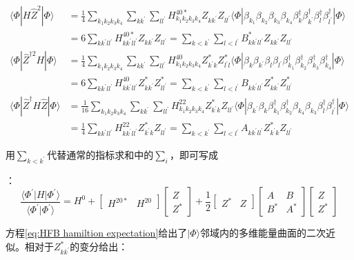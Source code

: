 \begin{booknote*}
\begin{align*}
\langle\Phi|H\hat{Z}^{2}|\Phi\rangle & =\frac{1}{4}\sum_{k_{1}k_{2}k_{3}k_{4}}\sum_{kk^{\prime}}\sum_{ll^{\prime}}H^{40*}_{k_{1}k_{2}k_{3}k_{4}}Z_{kk^{\prime}}Z_{ll^{\prime}}\langle\Phi|\beta_{k_{1}}\beta_{k_{2}}\beta_{k_{3}}\beta_{k_{4}}\beta^{\dagger}_{k}\beta^{\dagger}_{k^{\prime}}\beta^{\dagger}_{l}\beta^{\dagger}_{l^{\prime}}|\Phi\rangle\\
 & =6\sum_{kk^{\prime}ll^{\prime}}H^{40*}_{kk^{\prime}ll^{\prime}}Z_{kk^{\prime}}Z_{ll^{\prime}}=\sum_{k<k^{\prime}}\sum_{l<l^{\prime}}B^{*}_{kk^{\prime}ll^{\prime}}Z_{kk^{\prime}}Z_{ll^{\prime}}\\
\langle\Phi|\hat{Z}^{\dagger2}H|\Phi\rangle & =\frac{1}{4}\sum_{k_{1}k_{2}k_{3}k_{4}}\sum_{kk^{\prime}}\sum_{ll^{\prime}}H^{40}_{k_{1}k_{2}k_{3}k_{4}}Z^{*}_{k^{\prime}k}Z^{*}_{l^{\prime}l}\langle\Phi|\beta_{k}\beta_{k^{\prime}}\beta_{l}\beta_{l^{\prime}}\beta^{\dagger}_{k_{1}}\beta^{\dagger}_{k_{2}}\beta^{\dagger}_{k_{3}}\beta^{\dagger}_{k_{4}}|\Phi\rangle\\
 & =6\sum_{kk^{\prime}ll^{\prime}}H^{40}_{kk^{\prime}ll^{\prime}}Z^{*}_{kk^{\prime}}Z^{*}_{ll^{\prime}}=\sum_{k<k^{\prime}}\sum_{l<l^{\prime}}B_{kk^{\prime}ll^{\prime}}Z^{*}_{kk^{\prime}}Z^{*}_{ll^{\prime}}\\
\langle\Phi|\hat{Z}^{\dagger}H\hat{Z}|\Phi\rangle & =\frac{1}{16}\sum_{k_{1}k_{2}k_{3}k_{4}}\sum_{kk^{\prime}}\sum_{ll^{\prime}}H^{22}_{k_{1}k_{2}k_{3}k_{4}}Z^{*}_{k^{\prime}k}Z_{ll^{\prime}}\langle\Phi|\beta_{k^{\prime}}\beta_{k}\beta^{\dagger}_{k_{1}}\beta^{\dagger}_{k_{2}}\beta_{k_{4}}\beta_{k_{3}}\beta^{\dagger}_{l}\beta^{\dagger}_{l^{\prime}}|\Phi\rangle\\
 & =\frac{1}{4}\sum_{kk^{\prime}ll^{\prime}}H^{22}_{kk^{\prime}ll^{\prime}}Z^{*}_{k^{\prime}k}Z_{ll^{\prime}}=\sum_{k<k^{\prime}}\sum_{l<l^{\prime}}A_{kk^{\prime}ll^{\prime}}Z^{*}_{k^{\prime}k}Z_{ll^{\prime}}
\end{align*}

用$\sum_{k<k^{\prime}}$代替通常的指标求和中的$\sum_{i}$，即可写成

：
\[
\frac{\langle\Phi^{\prime}|H|\Phi^{\prime}\rangle}{\langle\Phi^{\prime}|\Phi^{\prime}\rangle}=H^{0}+\begin{bmatrix}H^{20*} & H^{20}\end{bmatrix}\begin{bmatrix}Z\\
Z^{*}
\end{bmatrix}+\frac{1}{2}\begin{bmatrix}Z^{*} & Z\end{bmatrix}\begin{bmatrix}A & B\\
B^{*} & A^{*}
\end{bmatrix}\begin{bmatrix}Z\\
Z^{*}
\end{bmatrix}
\]
\end{booknote*}
方程\ref{eq:HFB hamiltion expectation}给出了$|\Phi\rangle$邻域内的多维能量曲面的二次近似。相对于$Z^{*}_{kk^{\prime}}$的变分给出\cite{Be59}：

